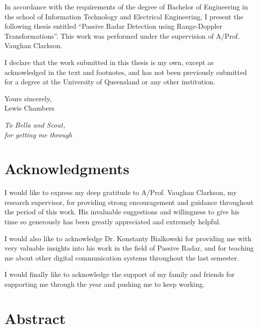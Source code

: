 \documentclass[12pt,openany,a4paper]{book}
\renewcommand{\baselinestretch}{1.2}	%
\begin{document}
In accordance with the requirements of the degree of Bachelor of
Engineering in the school of Information Technology and
Electrical Engineering, I present the
following thesis entitled ``Passive Radar Detection using Range-Doppler Transformations''.  This work was performed 
under the supervision of A/Prof. Vaughan Clarkson.

I declare that the work submitted in this thesis is my own, except as
acknowledged in the text and footnotes, and has not been previously
submitted for a degree at the University of Queensland or any other
institution.

\begin{flushright}
	Yours sincerely,\\
	\bigskip\bigskip
	\medskip
	Lewis Chambers
\end{flushright}

\cleardoublepage

\vspace*{70mm}
\begin{center}
\renewcommand{\baselinestretch}{1.0}
\sl
	To Bella and Scout, \\
	for getting me through
\end{center}

\chapter{Acknowledgments}

I would like to express my deep gratitude to A/Prof. Vaughan Clarkson, my research supervisor,
for providing strong encouragement and guidance throughout the period of this work. His invaluable
suggestions and willingness to give his time so generously has been greatly appreciated and extremely helpful.

\bigskip

I would also like to acknowledge Dr. Konstanty Bialkowski for providing me with very valuable insights
into his work in the field of Passive Radar, and for teaching me about other digital communication 
systems throughout the last semester.

\bigskip

I would finally like to acknowledge the support of my family and friends for supporting me through the year and pushing me to keep working.

\cleardoublepage

\chapter{Abstract}
\end{document}
